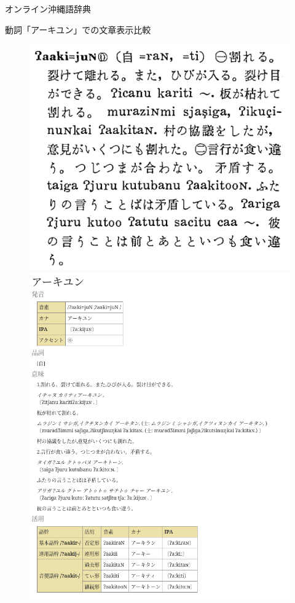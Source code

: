 \documentclass[14pt]{beamer}
\begin{document}
\begin{frame}{オンライン沖縄語辞典}
  \begin{block}{動詞「アーキユン」での文章表示比較}
    \begin{figure}[ht]
      \centering
      \begin{minipage}{0.5\textwidth}
        \includegraphics[height=0.5\paperheight,width=0.4\paperwidth]{oki-dict-example-aakiyun-original.png}
      \end{minipage}%
      \begin{minipage}{0.5\textwidth}
        \includegraphics[height=0.65\paperheight]{oki-dict-example-aakiyun-online.png}

\end{minipage}
\end{figure}
\end{block}
\end{frame}
\end{document}
